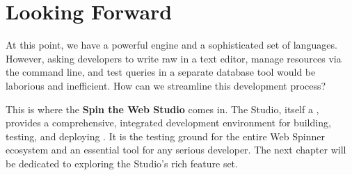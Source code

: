 \section{Looking Forward}
\label{sec:webspinner-forward}

At this point, we have a powerful engine and a sophisticated set of languages. However, asking developers to write raw \wbol{} in a text editor, manage resources via the command line, and test queries in a separate database tool would be laborious and inefficient. How can we streamline this development process?

This is where the \textbf{Spin the Web Studio} comes in. The Studio, itself a \webbaselet{}, provides a comprehensive, integrated development environment for building, testing, and deploying . It is the testing ground for the entire Web Spinner ecosystem and an essential tool for any serious developer. The next chapter will be dedicated to exploring the Studio's rich feature set.
